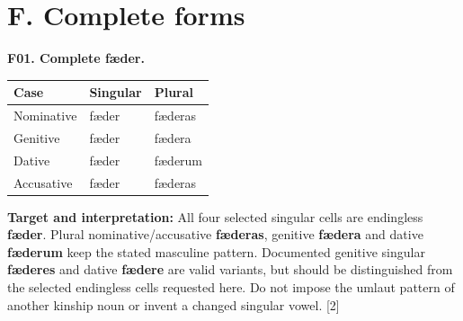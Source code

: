 \clearpage
\section*{F. Complete forms}

\par\begin{minipage}{\linewidth}\raggedright
\textbf{F01. Complete fæder.}

\par\begingroup
\fontsize{10.5}{13.2}\selectfont
\setlength{\LTleft}{0pt}\setlength{\LTright}{\fill}
\noindent
\begin{tabular}{@{}>{\raggedright\arraybackslash}p{39.46mm}>{\raggedright\arraybackslash}p{39.46mm}>{\raggedright\arraybackslash}p{39.46mm}@{}}
\toprule
\textbf{Case} & \textbf{Singular} & \textbf{Plural} \\
\midrule
Nominative & fæder & fæderas \\
Genitive & fæder & fædera \\
Dative & fæder & fæderum \\
Accusative & fæder & fæderas \\
\bottomrule
\end{tabular}
\par\endgroup

\textbf{Target and interpretation:} All four selected singular cells are endingless \textbf{fæder}. Plural nominative/\allowbreak{}accusative \textbf{fæderas}, genitive \textbf{fædera} and dative \textbf{fæderum} keep the stated masculine pattern. Documented genitive singular \textbf{fæderes} and dative \textbf{fædere} are valid variants, but should be distinguished from the selected endingless cells requested here. Do not impose the umlaut pattern of another kinship noun or invent a changed singular vowel. [2]

\end{minipage}\par\addvspace{4pt}

